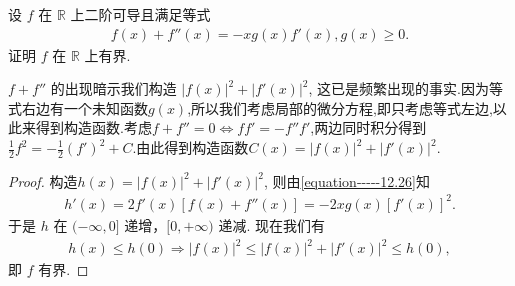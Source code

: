 \documentclass[../../main.tex]{subfiles}
\begin{document}
\begin{example}
设 $f$ 在 $\mathbb{R}$ 上二阶可导且满足等式
\begin{align}\label{equation-----12.26}
f(x)+f''(x)=-xg(x)f'(x),g(x)\geqslant0.
\end{align}
证明 $f$ 在 $\mathbb{R}$ 上有界.
\end{example}
\begin{note}
$f + f''$ 的出现暗示我们构造 $|f(x)|^2 + |f'(x)|^2$, 这已是频繁出现的事实.因为等式右边有一个未知函数$g(x)$,所以我们考虑局部的微分方程,即只考虑等式左边,以此来得到构造函数.考虑$f+f''=0\Leftrightarrow ff'=-f''f'$,两边同时积分得到$\frac{1}{2}f^2=-\frac{1}{2}(f')^2+C$.由此得到构造函数$C(x)=|f(x)|^2+|f'(x)|^2$.
\end{note}
\begin{proof}
构造$h(x)=|f(x)|^2 + |f'(x)|^2$, 则由\eqref{equation-----12.26}知
\begin{align*}
h'(x)=2f'(x)[f(x)+f''(x)]=-2xg(x)[f'(x)]^2.
\end{align*}
于是 $h$ 在 $(-\infty,0]$ 递增，$[0,+\infty)$ 递减.
现在我们有
\begin{align*}
h(x)\leqslant h(0)\Longrightarrow |f(x)|^2\leqslant |f(x)|^2+|f' (x)|^2\leqslant h(0),
\end{align*}
即 $f$ 有界. 

\end{proof}
\end{document}
